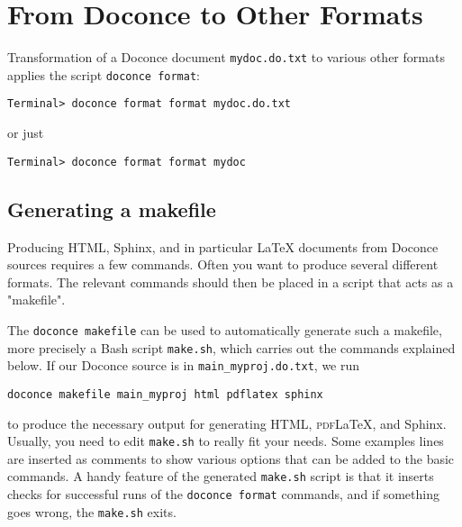\documentclass[%
oneside,                 %
final,                   %
10pt]{article}
\begin{document}
\section{From Doconce to Other Formats}
\label{doconce2formats}

Transformation of a Doconce document {\fontsize{10pt}{10pt}\Verb!mydoc.do.txt!} to various other
formats applies the script {\fontsize{10pt}{10pt}\Verb!doconce format!}:
\vspace{4pt}
\begin{Verbatim}[numbers=none,frame=lines,label=\fbox{{\tiny Terminal}},fontsize=\fontsize{9pt}{9pt},
labelposition=topline,framesep=2.5mm,framerule=0.7pt]
Terminal> doconce format format mydoc.do.txt
\end{Verbatim}
or just
\vspace{4pt}
\begin{Verbatim}[numbers=none,frame=lines,label=\fbox{{\tiny Terminal}},fontsize=\fontsize{9pt}{9pt},
labelposition=topline,framesep=2.5mm,framerule=0.7pt]
Terminal> doconce format format mydoc
\end{Verbatim}

\subsection{Generating a makefile}

Producing HTML, Sphinx, and in particular {\LaTeX} documents from
Doconce sources requires a few commands. Often you want to
produce several different formats. The relevant commands should
then be placed in a script that acts as a "makefile".

The {\fontsize{10pt}{10pt}\Verb!doconce makefile!} can be used to automatically generate
such a makefile, more precisely a Bash script {\fontsize{10pt}{10pt}\Verb!make.sh!}, which
carries out the commands explained below. If our Doconce source
is in {\fontsize{10pt}{10pt}\Verb!main_myproj.do.txt!}, we run

\vspace{4pt}
\begin{Verbatim}[numbers=none,frame=lines,label=\fbox{{\tiny Terminal}},fontsize=\fontsize{9pt}{9pt},
labelposition=topline,framesep=2.5mm,framerule=0.7pt]
doconce makefile main_myproj html pdflatex sphinx
\end{Verbatim}
to produce the necessary output for generating HTML, \textsc{pdf}{\LaTeX}, and
Sphinx. Usually, you need to edit {\fontsize{10pt}{10pt}\Verb!make.sh!} to really fit your
needs. Some examples lines are inserted as comments to show
various options that can be added to the basic commands.
A handy feature of the generated {\fontsize{10pt}{10pt}\Verb!make.sh!} script is that it
inserts checks for successful runs of the {\fontsize{10pt}{10pt}\Verb!doconce format!} commands,
and if something goes wrong, the {\fontsize{10pt}{10pt}\Verb!make.sh!} exits.
\end{document}
